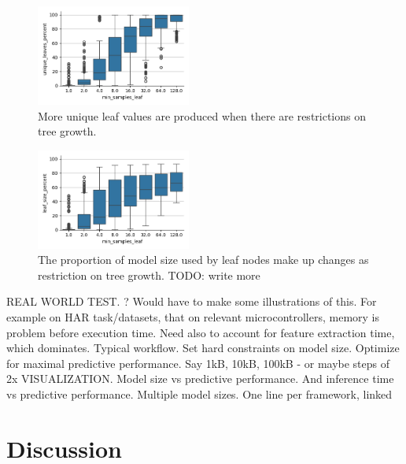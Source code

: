 \documentclass{article}
\begin{document}
\begin{figure}[h!]
\begin{center}
  \includegraphics[width=2in]{reports/figures/leaf-uniqueness.png}
  \end{center}
  \caption{ More unique leaf values are produced when there are restrictions on tree growth. }
  \label{fig:leaf_uniqueness}
\end{figure}

\begin{figure}[h!]
\begin{center}
  \includegraphics[width=2in]{reports/figures/leaf-proportion.png}
  \end{center}
  \caption{The proportion of model size used by leaf nodes make up changes as restriction on tree growth. TODO: write more }
  \label{fig:leaf_proportions}
\end{figure}







REAL WORLD TEST.
? Would have to make some illustrations of this.
For example on HAR task/datasets, that on relevant microcontrollers, memory is problem before execution time. Need also to account for feature extraction time, which dominates.
Typical workflow. Set hard constraints on model size. Optimize for maximal predictive performance. Say 1kB, 10kB, 100kB - or maybe steps of 2x
VISUALIZATION. Model size vs predictive performance. And inference time vs predictive performance. Multiple model sizes. One line per framework, linked 



\section{Discussion}
\end{document}

